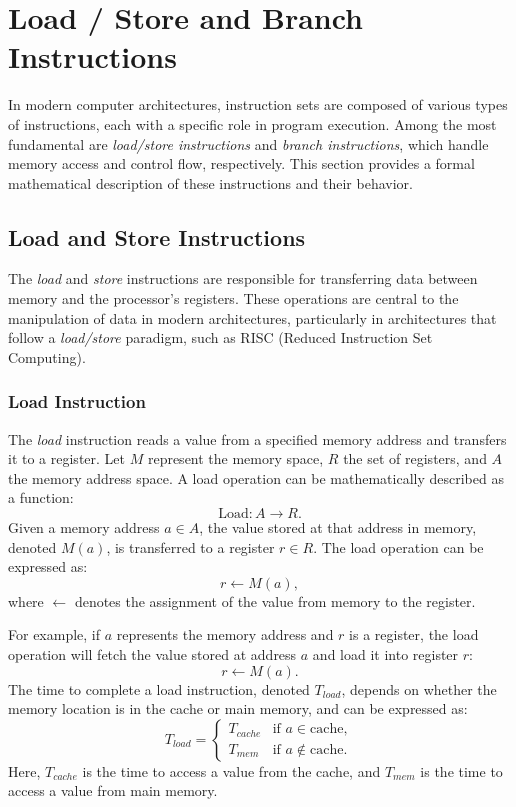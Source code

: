 \section{Load / Store and Branch Instructions}

In modern computer architectures, instruction sets are composed of various types of instructions, each with a specific role in program execution. Among the most fundamental are \emph{load/store instructions} and \emph{branch instructions}, which handle memory access and control flow, respectively. This section provides a formal mathematical description of these instructions and their behavior.

\subsection{Load and Store Instructions}

The \emph{load} and \emph{store} instructions are responsible for transferring data between memory and the processor's registers. These operations are central to the manipulation of data in modern architectures, particularly in architectures that follow a \emph{load/store} paradigm, such as RISC (Reduced Instruction Set Computing).

\subsubsection{Load Instruction}

The \emph{load} instruction reads a value from a specified memory address and transfers it to a register. Let $M$ represent the memory space, $R$ the set of registers, and $A$ the memory address space. A load operation can be mathematically described as a function:
\[
\text{Load}: A \to R.
\]
Given a memory address $a \in A$, the value stored at that address in memory, denoted $M(a)$, is transferred to a register $r \in R$. The load operation can be expressed as:
\[
r \gets M(a),
\]
where $\gets$ denotes the assignment of the value from memory to the register.

For example, if $a$ represents the memory address and $r$ is a register, the load operation will fetch the value stored at address $a$ and load it into register $r$:
\[
r \gets M(a).
\]
The time to complete a load instruction, denoted $T_{load}$, depends on whether the memory location is in the cache or main memory, and can be expressed as:
\[
T_{load} = 
\begin{cases} 
	T_{cache} & \text{if } a \in \text{cache}, \\
	T_{mem}   & \text{if } a \notin \text{cache}.
\end{cases}
\]
Here, $T_{cache}$ is the time to access a value from the cache, and $T_{mem}$ is the time to access a value from main memory.

